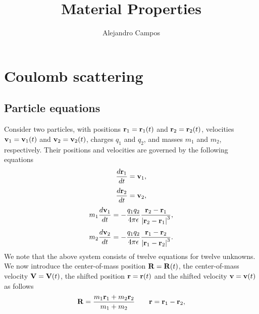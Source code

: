 \documentclass[a4paper,11pt]{report}
\title{Material Properties}
\author{Alejandro Campos}
\begin{document}
\maketitle
\tableofcontents

\chapter{Coulomb scattering}

\section{Particle equations}
\label{sec:coulomb_particle_equations}
Consider two particles, with positions $\mathbf{r}_1=\mathbf{r}_1(t)$ and $\mathbf{r}_2=\mathbf{r}_2(t)$, velocities $\mathbf{v}_1=\mathbf{v}_1(t)$ and $\mathbf{v}_2=\mathbf{v}_2(t)$, charges $q_1$ and $q_2$, and masses $m_1$ and $m_2$, respectively. Their positions and velocities are governed by the following equations 
\begin{equation}
    \label{eq:coul_particle_1_pos}
    \frac{d \mathbf{r}_1}{dt} = \mathbf{v}_1,
\end{equation}
\begin{equation}
    \label{eq:coul_particle_2_pos}
    \frac{d \mathbf{r}_2}{dt} = \mathbf{v}_2,
\end{equation}
\begin{equation}
    \label{eq:coul_particle_1_vel}
    m_1 \frac{d\mathbf{v}_1}{dt} = -\frac{q_1 q_2}{4 \pi \epsilon} \frac{\mathbf{r}_2 - \mathbf{r}_1}{\left | \mathbf{r}_2 - \mathbf{r}_1 \right |^3},
\end{equation}
\begin{equation}
    \label{eq:coul_particle_2_vel}
    m_2 \frac{d\mathbf{v}_2}{dt} = -\frac{q_1 q_2}{4 \pi \epsilon} \frac{\mathbf{r}_1 - \mathbf{r}_2}{\left | \mathbf{r}_1 - \mathbf{r}_2 \right |^3}.
\end{equation}
We note that the above system consists of twelve equations for twelve unknowns. We now introduce the center-of-mass position $\mathbf{R} = \mathbf{R}(t)$, the center-of-mass velocity $\mathbf{V} = \mathbf{V}(t)$, the shifted position $\mathbf{r} = \mathbf{r}(t)$ and the shifted velocity $\mathbf{v} = \mathbf{v}(t)$ as follows
\begin{equation*}
    \mathbf{R} = \frac{m_1 \mathbf{r}_1 + m_2 \mathbf{r}_2}{m_1 + m_2} \qquad \mathbf{r} = \mathbf{r}_1 - \mathbf{r}_2,
\end{equation*}
\end{document}
